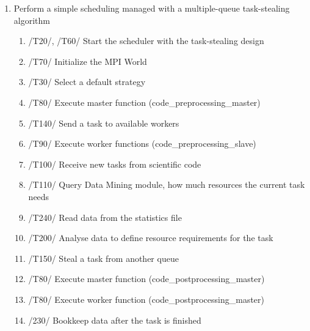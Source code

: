 {\begin{enumerate}
			\item Perform a simple scheduling managed with a multiple-queue task-stealing algorithm
				\begin{enumerate}
				
				\item /T20/, /T60/ Start the scheduler with the task-stealing design
				\item /T70/ Initialize the MPI World
				\item /T30/ Select a default strategy
				\item /T80/ Execute master function (code\_preprocessing\_master)
				\item /T140/ Send a task to available workers
				\item /T90/ Execute worker functions (code\_preprocessing\_slave)
				\item /T100/ Receive new tasks from scientific code
				\item /T110/ Query Data Mining module, how much resources the current task needs
				\item /T240/ Read data from the statistics file
				\item /T200/ Analyse data to define resource requirements for the task
				\item /T150/ Steal a task from another queue
				\item /T80/ Execute master function (code\_postprocessing\_master)
				\item /T80/ Execute worker function (code\_postprocessing\_master)
				\item /230/ Bookkeep data after the task is finished
				
				\end{enumerate}
			
				

\end{enumerate}}
